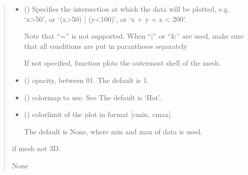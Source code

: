 \documentclass[letterpaper,10pt,english]{sphinxmanual}
\begin{document}
\begin{fulllineitems}
\begin{quote}
\begin{description}
\begin{itemize}
\item {} 
\sphinxAtStartPar
{} (\sphinxstyleliteralemphasis{\sphinxupquote{, }}) \textendash{} 
\sphinxAtStartPar
Specifies the intersection at which the data will be plotted, e.g. ‘x\textgreater{}50’, or ‘(x\textgreater{}50) | (y\textless{}100)’, or ‘x + y + z \textless{} 200’.

\sphinxAtStartPar
Note that “=” is not supported. When “|” or “\&” are used, make sure that all conditions are put in parantheses separately

\sphinxAtStartPar
If not specified, function plots the outermost shell of the mesh.


\item {} 
\sphinxAtStartPar
{} (\sphinxstyleliteralemphasis{\sphinxupquote{, }}) \textendash{} opacity, between 0\sphinxhyphen{}1. The default is 1.

\item {} 
\sphinxAtStartPar
{} (\sphinxstyleliteralemphasis{\sphinxupquote{, }}) \textendash{} colormap to use. See The default is ‘Hot’.

\item {} 
\sphinxAtStartPar
{} (\sphinxstyleliteralemphasis{\sphinxupquote{, }}) \textendash{} 
\sphinxAtStartPar
colorlimit of the plot in format {[}cmin, cmax{]}.

\sphinxAtStartPar
The default is None, where min and max of data is used.


\end{itemize}

\sphinxAtStartPar
{} \textendash{} if mesh not 3D.

\sphinxAtStartPar
None

\end{description}\end{quote}

\end{fulllineitems}
\end{document}

